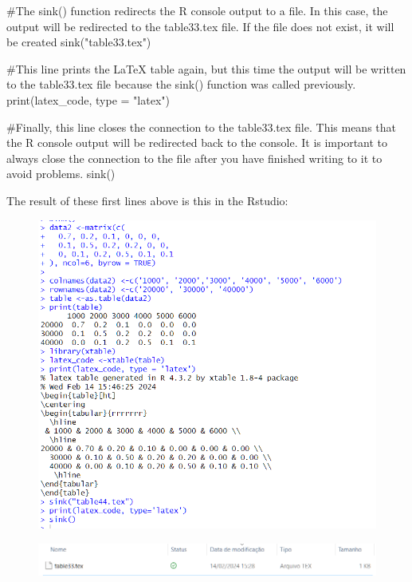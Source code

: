 \documentclass{article}
\begin{document}
\begin{spverbatim}
#The sink() function redirects the R console output to a file. In this case, the output will be redirected to the table33.tex file. If the file does not exist, it will be created
sink("table33.tex")

#This line prints the LaTeX table again, but this time the output will be written to the table33.tex file because the sink() function was called previously.
print(latex_code, type = "latex")

#Finally, this line closes the connection to the table33.tex file. This means that the R console output will be redirected back to the console. It is important to always close the connection to the file after you have finished writing to it to avoid problems.
sink()
\end{spverbatim}
The result of these first lines above is this in the Rstudio:
\begin{figure}[H]
    \centering
    \includegraphics[width=1\linewidth]{imagesfolder/image27.png}
\end{figure}
\begin{figure}[H]
    \centering
    \includegraphics[width=1\linewidth]{imagesfolder/image28.png}
\end{figure}
\end{document}
